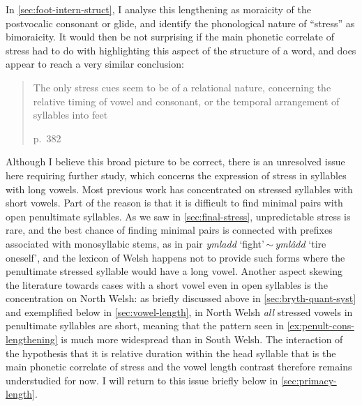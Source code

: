In \cref{sec:foot-intern-struct}, I analyse this lengthening as moraicity of the postvocalic consonant or glide, and identify the phonological nature of \enquote{stress} as bimoraicity. It would then be not surprising if the main phonetic correlate of stress had to do with highlighting this aspect of the structure of a word, and \citet{williams85:_pitch_welsh} does appear to reach a very similar conclusion: \blockquote[p.~382][.]{The only stress cues seem to be of a relational nature, concerning the relative timing of vowel and consonant, or the temporal arrangement of syllables into feet}

Although I believe this broad picture to be correct, there is an unresolved issue here requiring further study, which concerns the expression of stress in syllables with long vowels. Most previous work has concentrated on stressed syllables with short vowels. Part of the reason is that it is difficult to find minimal pairs with open penultimate syllables. As we saw in \cref{sec:final-stress}, unpredictable stress is rare, and the best chance of finding minimal pairs is connected with prefixes associated with monosyllabic stems, as in  pair \emph{ymladd} \ipa{[ˈəmlað]} `fight'\,$\sim$\,\emph{ymlâdd} \ipa{[əmˈlaːð]} `tire oneself', and the lexicon of Welsh happens not to provide such forms where the penultimate stressed syllable would have a long vowel. Another aspect skewing the literature towards cases with a short vowel even in open syllables is the concentration on North Welsh: as briefly discussed above in \cref{sec:bryth-quant-syst} and exemplified below in \cref{sec:vowel-length}, in North Welsh \emph{all} stressed vowels in penultimate syllables are short, meaning that the pattern seen in \cref{ex:penult-cons-lengthening} is much more widespread than in South Welsh. The interaction of the hypothesis that it is relative duration within the head syllable that is the main phonetic correlate of stress and the vowel length contrast therefore remains understudied for now. I will return to this issue briefly below in \cref{sec:primacy-length}.

